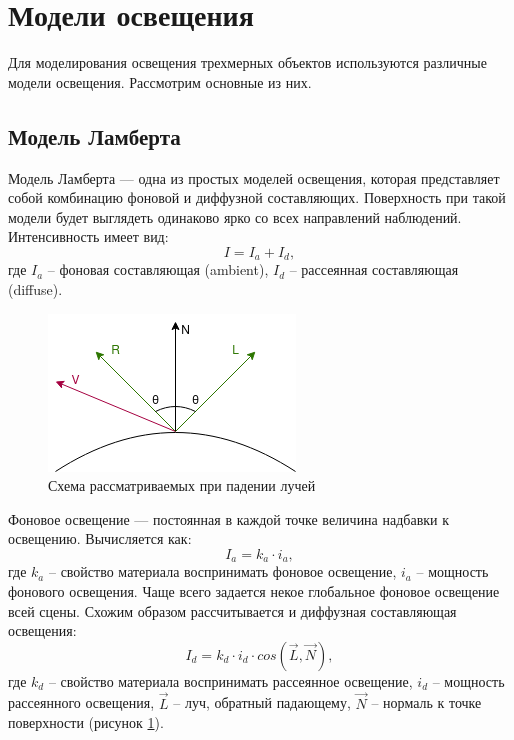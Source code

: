 
\section{Модели освещения}

Для моделирования освещения трехмерных объектов используются различные модели освещения. Рассмотрим основные из них.

\subsection{Модель Ламберта}

Модель Ламберта --- одна из простых моделей освещения, которая представляет собой комбинацию фоновой и диффузной составляющих. Поверхность при такой модели будет выглядеть одинаково ярко со всех направлений наблюдений. Интенсивность имеет вид:
\begin{equation}
	I = I_{a} + I_{d},
\end{equation}
где $I_{a}$ -- фоновая составляющая (ambient), $I_{d}$ -- рассеянная составляющая (diffuse).

\begin{figure}[H]
	\begin{center}
		\includegraphics[scale=0.8]{assets/i_ray.png}
	\end{center}
	\caption{Схема рассматриваемых при падении лучей}
	\label{i_ray}
\end{figure}

Фоновое освещение --- постоянная в каждой точке величина надбавки к освещению. Вычисляется как:
\begin{equation}
	I_{a} = k_{a} \cdot i_{a},
\end{equation}
где $k_{a}$ -- свойство материала воспринимать фоновое освещение, $i_{a}$ -- мощность фонового освещения. Чаще всего задается некое глобальное фоновое освещение всей сцены.
Схожим образом рассчитывается и диффузная составляющая освещения:
\begin{equation}\label{id}
	I_{d} = k_{d} \cdot i_{d} \cdot cos(\vec{L}, \vec{N}),
\end{equation}
где $k_{d}$ -- свойство материала воспринимать рассеянное освещение, $i_{d}$ -- мощность рассеянного освещения, $\vec{L}$ -- луч, обратный падающему, $\vec{N}$ -- нормаль к точке поверхности (рисунок \ref{i_ray}). 


